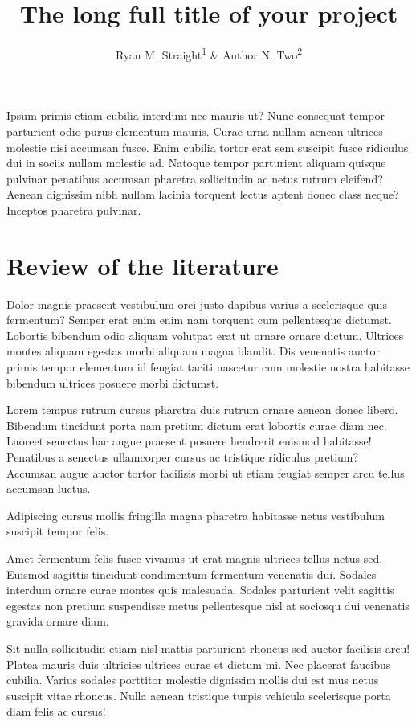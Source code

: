 \documentclass[
  man]{apa6}
\title{The long full title of your project}
\author{Ryan M. Straight\textsuperscript{1} \& Author N. Two\textsuperscript{2}}
\date{}
\affiliation{\vspace{0.5cm}\textsuperscript{1} University of Arizona\\\textsuperscript{2} School of Hard Knocks}
\begin{document}
\maketitle

Ipsum primis etiam cubilia interdum nec mauris ut? Nunc consequat tempor parturient odio purus elementum mauris. Curae urna nullam aenean ultrices molestie nisi accumsan fusce. Enim cubilia tortor erat sem suscipit fusce ridiculus dui in sociis nullam molestie ad. Natoque tempor parturient aliquam quisque pulvinar penatibus accumsan pharetra sollicitudin ac netus rutrum eleifend? Aenean dignissim nibh nullam lacinia torquent lectus aptent donec class neque? Inceptos pharetra pulvinar.

\hypertarget{review-of-the-literature}{%
\section{Review of the literature}\label{review-of-the-literature}}

Dolor magnis praesent vestibulum orci justo dapibus varius a scelerisque quis fermentum? Semper erat enim enim nam torquent cum pellentesque dictumst. Lobortis bibendum odio aliquam volutpat erat ut ornare ornare dictum. Ultrices montes aliquam egestas morbi aliquam magna blandit. Dis venenatis auctor primis tempor elementum id feugiat taciti nascetur cum molestie nostra habitasse bibendum ultrices posuere morbi dictumst.

Lorem tempus rutrum cursus pharetra duis rutrum ornare aenean donec libero. Bibendum tincidunt porta nam pretium dictum erat lobortis curae diam nec. Laoreet senectus hac augue praesent posuere hendrerit euismod habitasse! Penatibus a senectus ullamcorper cursus ac tristique ridiculus pretium? Accumsan augue auctor tortor facilisis morbi ut etiam feugiat semper arcu tellus accumsan luctus.

Adipiscing cursus mollis fringilla magna pharetra habitasse netus vestibulum suscipit tempor felis.

Amet fermentum felis fusce vivamus ut erat magnis ultrices tellus netus sed. Euismod sagittis tincidunt condimentum fermentum venenatis dui. Sodales interdum ornare curae montes quis malesuada. Sodales parturient velit sagittis egestas non pretium suspendisse metus pellentesque nisl at sociosqu dui venenatis gravida ornare diam.

Sit nulla sollicitudin etiam nisl mattis parturient rhoncus sed auctor facilisis arcu! Platea mauris duis ultricies ultrices curae et dictum mi. Nec placerat faucibus cubilia. Varius sodales porttitor molestie dignissim mollis dui est mus netus suscipit vitae rhoncus. Nulla aenean tristique turpis vehicula scelerisque porta diam felis ac cursus!
\end{document}
